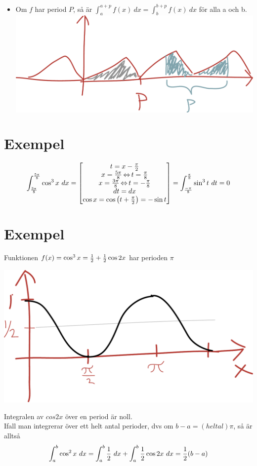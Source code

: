 \documentclass{article}
\begin{document}
\begin{itemize}
  \item Om $f$ har period $P$, så är $\int^{a+p}_a{f(x)\ dx}=\int^{b+p}_b{f(x)\ dx}$ för alla a och b.\\
    \includegraphics[scale=0.25]{img/img3.pdf}
\end{itemize}

\section{Exempel}
$$ \int^{5\pi \over 8}_{3\pi \over 8}{\cos^3 x\ dx}=\left[\begin{matrix}t=x-\frac{\pi}{2}\\x=\frac{5 \pi}{8} \operatorname{\Leftrightarrow} t=\frac{\pi}{8} \\x=\frac{3 \pi}{8} \operatorname{\Leftrightarrow} t=-\frac{\pi}{8}\\dt=dx\\ \cos x = \cos\left(t+\frac{\pi}{2}\right) = -\sin t\end{matrix}\right]=
\int^{\pi \over 8}_{-\pi \over 8}{\sin^3 t\ dt} = 0 $$

\section{Exempel}
Funktionen $f(x)=\cos^3 x = \frac{1}{2} + \frac{1}{2} \cos 2x$ har perioden $\pi$

\includegraphics[scale=0.25]{img/img4.pdf}

Integralen av $cos 2x$ över en period är noll.\\
Ifall man integrerar över ett helt antal perioder, dvs om $b-a = (heltal)\pi$, så är alltså
$$ \int^b_a{\cos^2 x\ dx} = \int^b_a{\frac{1}{2}\ dx}+ \int^b_a{\frac{1}{2} \cos 2x\ dx} = \frac{1}{2} (b-a) $$
\end{document}
